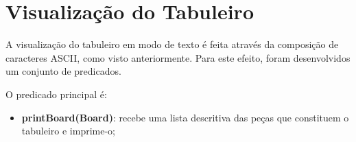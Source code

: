 \documentclass[a4paper]{article}
\begin{document}
\section{Visualização do Tabuleiro\newline}

A visualização do tabuleiro em modo de texto é feita através da composição
de caracteres ASCII, como visto anteriormente. Para este efeito, foram desenvolvidos um conjunto de predicados. 

O predicado principal é:
\begin{itemize}
	\item \textbf{printBoard(Board)}: recebe uma lista descritiva das peças que constituem o tabuleiro e imprime-o;
\end{itemize}
\end{document}

